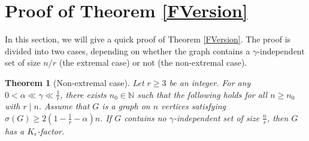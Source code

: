\documentclass[11pt, a4paper]{article}
\newtheorem{theorem}{Theorem}[section]
\theoremstyle{definition}
\newcommand{\<}{\subseteq}
\begin{document}


\section{Proof of Theorem \ref{FVersion}}\label{section3}

In this section, we will give a quick proof of Theorem \ref{FVersion}. The proof is divided into two cases, depending on whether the graph contains a $\gamma$-independent set of size ${n}/{r}$ (the extremal case) or not (the non-extremal case). %
\begin{theorem}[Non-extremal case]\label{non-extremal}
   Let $r\geq 3$ be an integer. For any $0< \alpha\ll \gamma\ll \frac{1}{r}$, there exists $n_0\in \mathbb{N}$ such that the following holds for all $n\geq n_0$ with $r\mid n$. 
   Assume that $G$ is a graph on $n$ vertices satisfying  $\sigma(G)\geq 2(1-\frac{1}{r}-\alpha)n$. If $G$ contains no $\gamma$-independent set of size $\frac{n}{r}$, then $G$ has a $K_r$-factor. 
\end{theorem}
\end{document}

